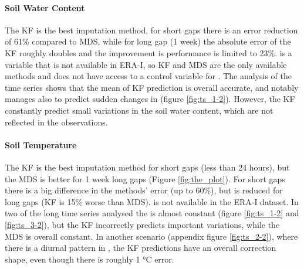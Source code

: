 \documentclass{article}
\begin{document}
\paragraph{Soil Water Content} The KF is the best imputation method, for short gaps there is an error reduction of 61\% compared to MDS, while for long gap (1 week) the absolute error of the KF roughly doubles and the improvement is performance is limited to 23\%.  is a variable that is not available in ERA-I, so KF and MDS are the only available methods and does not have access to a control variable for .
The analysis of the time series shows that the mean of KF prediction is overall accurate, and notably manages also to predict sudden changes in  (figure \ref{fig:ts_1-2}). However, the KF constantly predict small variations in the soil water content, which are not reflected in the observations.

\paragraph{Soil Temperature} The KF is the best imputation method for short gaps (less than 24 hours), but the MDS is better for 1 week long gaps (Figure \ref{fig:the_plot}). For short gaps there is a big difference in the methods' error (up to 60\%), but is reduced for long gaps (KF is 15\% worse than MDS).
 is not available in the ERA-I dataset.
In two of the long time series analysed the  is almost constant (figure \ref{fig:ts_1-2} and \ref{fig:ts_3-2}), but the KF incorrectly predicts important variations, while the MDS is overall constant. In another scenario (appendix figure \ref{fig:ts_2-2}), where there is a diurnal pattern in , the KF predictions have an overall correction shape, even though there is roughly 1 °C error.


\newcommand{\CapTs}[2]{#1 to visualize the imputation of #2 using different methods: Kalman Filter, ERA-Interim (ERA-I) and Marginal Distribution Sampling (MDS). For each variable, 3 random artificial gap (length 6 hours, 12 hours, 1 week) are imputed using the three methods: Kalman Filter (green), ERA-I (orange), MDS (purple).  For the Kalman Filter the shared area show the uncertainty of the prediction $\pm 2 \sigma$ (standard deviation). The grey shaded area and the vertical black lines delimit the artificial gaps, where the observations are not available to the model but are used to assess the imputation performance. The ERA-I prediction is the control variable of the Kalman Filter. The Kalman Filter model has been fine-tuned to each variable (\textit{KF-\textlangle var\textrangle-Sin-6\_336}).}
\end{document}
